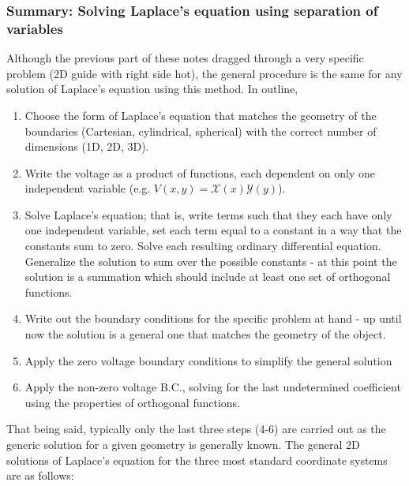 \documentclass[12pt]{article}
\begin{document}
\begin{flushleft}
\subsubsection*{\color{myblue} Summary: Solving Laplace's equation using separation of variables}

Although the previous part of these notes dragged through a very specific problem (2D guide with right side hot), the general procedure is the same for any solution of Laplace's equation using this method.  In outline,

\begin{enumerate}
\item Choose the form of Laplace's equation that matches the geometry of the boundaries (Cartesian, cylindrical, spherical) with the correct number of dimensions (1D, 2D, 3D).
\item Write the voltage as a product of functions, each dependent on only one independent variable (e.g. $V(x,y)=\mathcal{X}(x)\mathcal{Y}(y)$).
\item Solve Laplace's equation; that is, write terms such that they each have only one independent variable, set each term equal to a constant in a way that the constants sum to zero.  Solve each resulting ordinary differential equation.  Generalize the solution to sum over the possible constants - at this point the solution is a summation which should include at least one set of orthogonal functions.
\item Write out the boundary conditions for the specific problem at hand - up until now the solution is a general one that matches the geometry of the object.
\item Apply the zero voltage boundary conditions to simplify the general solution
\item Apply the non-zero voltage B.C., solving for the last undetermined coefficient using the properties of orthogonal functions.
\end{enumerate}

That being said, typically only the last three steps (4-6) are carried out as the generic solution for a given geometry is generally known.  The general 2D solutions of Laplace's equation for the three most standard coordinate systems are as follows:


\end{flushleft}
\end{document}
